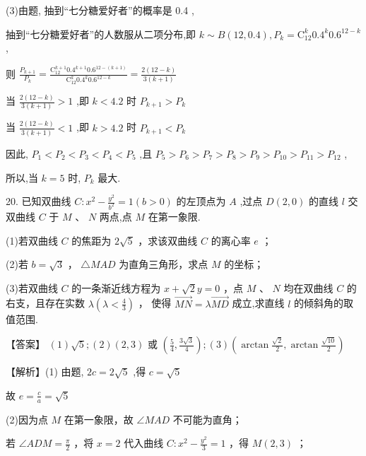 \documentclass[10pt]{article}
\begin{document}
(3)由题, 抽到“七分糖爱好者”的概率是 0.4 ,

抽到“七分糖爱好者”的人数服从二项分布,即 \(k \sim  B\left( {{12},{0.4}}\right) ,{P}_{k} = {\mathrm{C}}_{12}^{k}{0.4}^{k}{0.6}^{{12} - k}\) ,

则 \(\frac{{P}_{k + 1}}{{P}_{k}} = \frac{{\mathrm{C}}_{12}^{k + 1}{0.4}^{k + 1}{0.6}^{{12} - \left( {k + 1}\right) }}{{\mathrm{C}}_{12}^{k}{0.4}^{k}{0.6}^{{12} - k}} = \frac{2\left( {{12} - k}\right) }{3\left( {k + 1}\right) }\)

当 \(\frac{2\left( {{12} - k}\right) }{3\left( {k + 1}\right) } > 1\) ,即 \(k < {4.2}\) 时 \({P}_{k + 1} > {P}_{k}\)

当 \(\frac{2\left( {{12} - k}\right) }{3\left( {k + 1}\right) } < 1\) ,即 \(k > {4.2}\) 时 \({P}_{k + 1} < {P}_{k}\)

因此, \({P}_{1} < {P}_{2} < {P}_{3} < {P}_{4} < {P}_{5}\) ,且 \({P}_{5} > {P}_{6} > {P}_{7} > {P}_{8} > {P}_{9} > {P}_{10} > {P}_{11} > {P}_{12}\) ,

所以,当 \(k = 5\) 时, \({P}_{k}\) 最大.

20. 已知双曲线 \(C : {x}^{2} - \frac{{y}^{2}}{{b}^{2}} = 1\left( {b > 0}\right)\) 的左顶点为 \(A\) ,过点 \(D\left( {2,0}\right)\) 的直线 \(l\) 交双曲线 \(C\) 于 \(M\text{ 、 }N\) 两点,点 \(M\) 在第一象限.

(1)若双曲线 \(C\) 的焦距为 \(2\sqrt{5}\) ，求该双曲线 \(C\) 的离心率 \(e\) ；

(2)若 \(b = \sqrt{3}\) ， \(\bigtriangleup  {MAD}\) 为直角三角形，求点 \(M\) 的坐标；

(3)若双曲线 \(C\) 的一条渐近线方程为 \(x + \sqrt{2}y = 0\) ，点 \(M\) 、 \(N\) 均在双曲线 \(C\) 的右支，且存在实数 \(\lambda \left( {\lambda  < \frac{4}{3}}\right)\) ， 使得 \(\overrightarrow{MN} = \lambda \overrightarrow{MD}\) 成立,求直线 \(l\) 的倾斜角的取值范围.

【答案】 \(\left( 1\right) \sqrt{5};\left( 2\right) \left( {2,3}\right)\) 或 \(\left( {\frac{5}{4},\frac{3\sqrt{3}}{4}}\right) ;\left( 3\right) \left( {\arctan \frac{\sqrt{2}}{2},\arctan \frac{\sqrt{10}}{2}}\right)\)

【解析】(1) 由题, \({2c} = 2\sqrt{5}\) ,得 \(c = \sqrt{5}\)

故 \(e = \frac{c}{a} = \sqrt{5}\)

(2)因为点 \(M\) 在第一象限，故 \(\angle {MAD}\) 不可能为直角；

若 \(\angle {ADM} = \frac{\pi }{2}\) ，将 \(x = 2\) 代入曲线 \(C : {x}^{2} - \frac{{y}^{2}}{3} = 1\) ，得 \(M\left( {2,3}\right)\) ；
\end{document}

